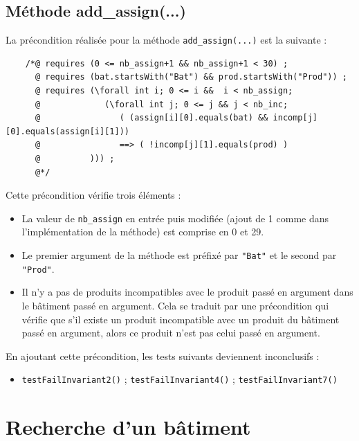 \documentclass{article}
\begin{document}
\subsection{Méthode add\_assign(...)}

\noindent
La précondition réalisée pour la méthode \texttt{add\_assign(...)} est la suivante :
\vspace{0.3cm}

\noindent
\begin{verbatim}
    /*@ requires (0 <= nb_assign+1 && nb_assign+1 < 30) ;
      @ requires (bat.startsWith("Bat") && prod.startsWith("Prod")) ;
      @ requires (\forall int i; 0 <= i &&  i < nb_assign;
      @	            (\forall int j; 0 <= j && j < nb_inc;
      @	               ( (assign[i][0].equals(bat) && incomp[j][0].equals(assign[i][1]))
      @	               ==> ( !incomp[j][1].equals(prod) )
      @          ))) ;
      @*/
\end{verbatim}
\vspace{0.2cm}

\noindent
Cette précondition vérifie trois éléments :
\begin{itemize}
\item La valeur de \texttt{nb\_assign} en entrée puis modifiée (ajout de 1 comme dans l'implémentation de la méthode) est comprise en 0 et 29.
\item Le premier argument de la méthode est préfixé par \texttt{"Bat"} et le second par \texttt{"Prod"}.
\item Il n'y a pas de produits incompatibles avec le produit passé en argument dans le bâtiment passé en argument. Cela se traduit par une précondition qui vérifie que s'il existe un produit incompatible avec un produit du bâtiment passé en argument, alors ce produit n'est pas celui passé en argument.
\end{itemize}

\vspace{0.3cm}
\noindent
En ajoutant cette précondition, les tests suivants deviennent inconclusifs :
\begin{itemize}
\renewcommand{\labelitemi}{$\rightarrow$} 
\item \texttt{testFailInvariant2()} ; \texttt{testFailInvariant4()} ; \texttt{testFailInvariant7()}
\end{itemize}

\section{Recherche d'un bâtiment}
\end{document}

